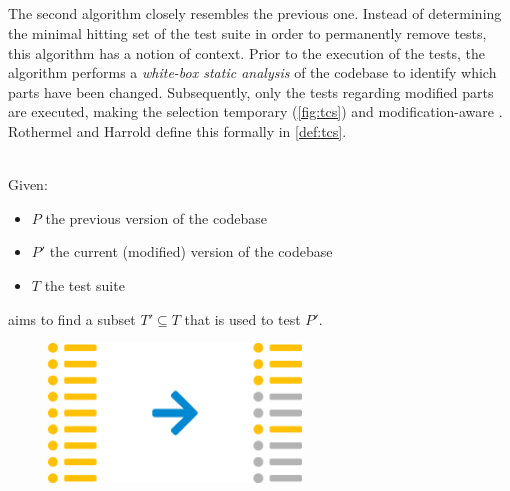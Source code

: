 
\subsection{\tcs{}}
The second algorithm closely resembles the previous one. Instead of determining the minimal hitting set of the test suite in order to permanently remove tests, this algorithm has a notion of context. Prior to the execution of the tests, the algorithm performs a \emph{white-box static analysis} of the codebase to identify which parts have been changed. Subsequently, only the tests regarding modified parts are executed, making the selection temporary (\autoref{fig:tcs}) and modification-aware \cite{10.1002/stv.430}. Rothermel and Harrold define this formally in \autoref{def:tcs}.

\begin{definition}[\tcs{}]
\label{def:tcs}
\mbox{}\\Given:
\begin{itemize}
	\item $P$ the previous version of the codebase
	\item $P'$ the current (modified) version of the codebase
	\item $T$ the test suite
\end{itemize}

\noindent \tcs{} aims to find a subset $T' \subseteq T$ that is used to test $P'$. 
\end{definition}

\begin{figure}[htbp!]
	\centering
	\includegraphics[width=0.6\textwidth]{assets/approach-tcs.pdf}
	\caption{\tcs{}}
	\label{fig:tcs}
\end{figure}